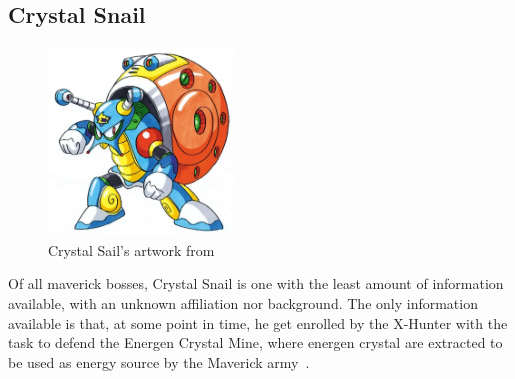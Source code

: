 \subsection{Crystal Snail}\label{boss:Crystal_snail}
\begin{figure}[htp]
	\centering
	\includegraphics[height=5cm]{figures/X2/Crystal_snail/Crystal_Snail.png}
	\caption{Crystal Sail's artwork from \cite{book:MMX_Complete_art}}
\end{figure}
Of all maverick bosses, Crystal Snail is one with the least amount of information available, with an unknown affiliation nor background. The only information available is that, at some point in time, he get enrolled by the X-Hunter with the task to defend the Energen Crystal Mine, where energen crystal are extracted to be used as energy source by the Maverick army~\cite{wayback:X2_resources}.
